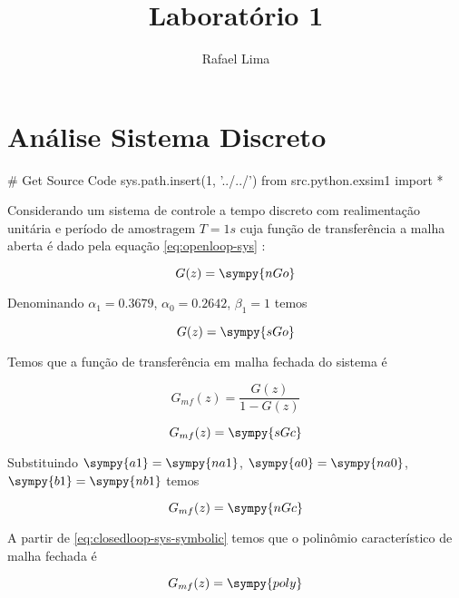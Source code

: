\documentclass[a4paper,11pt]{article}
\title{Laboratório 1} %
\author{Rafael Lima}
\begin{document}

\section{Análise Sistema Discreto}

\begin{sympycode}
# Get Source Code
sys.path.insert(1, '../../')
from src.python.exsim1 import *
\end{sympycode}

Considerando um sistema de controle a tempo discreto com realimentação unitária e período de amostragem $T = 1s$ cuja função de transferência a malha aberta é dado pela equação \ref{eq:openloop-sys} :

\begin{equation}\label{eq:openloop-sys}
    G(z) = \sympy{nGo}
\end{equation}

Denominando $\alpha_1 = 0.3679$, $\alpha_0 = 0.2642$, $\beta_1 = 1$ temos

\begin{equation}\label{eq:openloop-sys-symbolic}
    G(z) = \sympy{sGo}
\end{equation}

Temos que a função de transferência em malha fechada do sistema é

$$G_{mf}(z) = \frac{G(z)}{1-G(z)}$$

\begin{equation}\label{eq:closedloop-sys-symbolic}
    G_{mf}(z) = \sympy{sGc}
\end{equation}

Substituindo $\sympy{a1} = \sympy{na1}$, $\sympy{a0} = \sympy{na0}$, $\sympy{b1} = \sympy{nb1}$ temos

\begin{equation}\label{eq:closedloop-sys}
    G_{mf}(z) = \sympy{nGc}
\end{equation}

A partir de \ref{eq:closedloop-sys-symbolic} temos que o polinômio característico de malha fechada é

\begin{equation}\label{eq:poly-sys-symbolic}
    G_{mf}(z) = \sympy{poly}
\end{equation}
\end{document}
